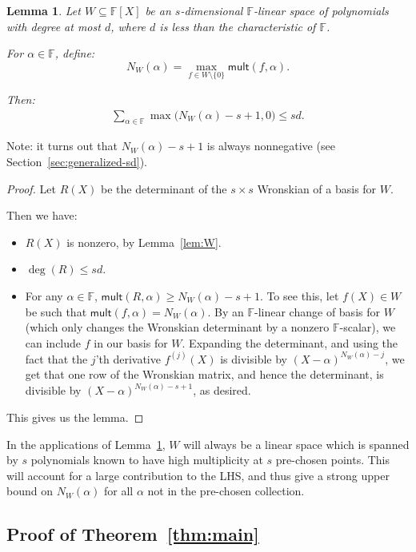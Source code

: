 \documentclass{article}
\newtheorem{lemma}[theorem]{Lemma}
\newcommand{\F}{\mathbb{F}}
\newcommand{\mult}{\mathsf{mult}}
\begin{document}
\begin{lemma}\label{lem:Wmult}
Let $W \subseteq\F[X]$ be an $s$-dimensional $\F$-linear space of polynomials with degree at most $d$, where $d$ is less than the characteristic of $\F$.
 
 For $\alpha \in \F$, define:
 $$ N_W(\alpha) = \max_{f \in W\setminus \{0\}} \mult(f, \alpha).$$

 Then:
 \begin{align}
  \label{eq:multbound}
  \sum_{\alpha \in \F } \max \bigg( N_W(\alpha) - s + 1 , 0 \bigg)  \leq  s d.
 \end{align}
\end{lemma}
Note: it turns out that $N_W(\alpha) - s + 1$ is always nonnegative (see Section~\ref{sec:generalized-sd}).
\begin{proof}
Let $R(X)$ be the determinant of the $s \times s$ Wronskian of a basis for $W$.

Then we have:
\begin{itemize}
\item $R(X)$ is nonzero, by Lemma~\ref{lem:W}.
 \item $\deg(R) \leq sd$.
 \item For any $\alpha\in \F$, $\mult(R, \alpha) \geq N_W(\alpha)-s + 1$. 
 To see this, let $f(X) \in W$ be such that $\mult(f, \alpha) = N_W(\alpha)$. By an $\F$-linear change of basis for $W$ (which only changes the Wronskian determinant by a nonzero $\F$-scalar), we can include $f$ in our basis for $W$. Expanding the determinant, and using the fact that the $j$'th derivative $f^{(j)}(X)$ is divisible by $(X-\alpha)^{N_W(\alpha) - j}$, 
 we get that one row of the Wronskian matrix, and hence the determinant, is divisible by $(X-\alpha)^{N_W(\alpha)-s+1}$, as desired.
\end{itemize}
This gives us the lemma.
\end{proof}



In the applications of Lemma~\ref{lem:Wmult}, $W$ will always be a linear space which is spanned by $s$ polynomials known to have high multiplicity at $s$ pre-chosen points. This will account for a large contribution to the LHS, and thus give a strong upper bound on $N_W(\alpha)$ for all  $\alpha$ not in the pre-chosen collection.


\subsection{Proof of Theorem~\ref{thm:main}}
\end{document}
